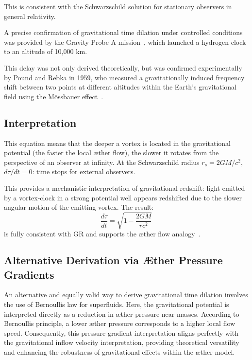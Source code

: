 This is consistent with the Schwarzschild solution for stationary observers in general relativity.

A precise confirmation of gravitational time dilation under controlled conditions was provided by the Gravity Probe A mission~\cite{vessot_levine_1980}, which launched a hydrogen clock to an altitude of 10,000 km.

This delay was not only derived theoretically, but was confirmed experimentally by Pound and Rebka in 1959, who measured a gravitationally induced frequency shift between two points at different altitudes within the Earth's gravitational field using the Mössbauer effect~\cite{pound_rebka_1959}.

\subsection*{Interpretation}

This equation means that the deeper a vortex is located in the gravitational potential (the faster the local æther flow), the slower it rotates from the perspective of an observer at infinity. At the Schwarzschild radius $r_s = 2GM/c^2$, $d\tau/dt = 0$: time stops for external observers.

This provides a mechanistic interpretation of gravitational redshift: light emitted by a vortex-clock in a strong potential well appears redshifted due to the slower angular motion of the emitting vortex. The result:
\[
\boxed{\frac{d\tau}{dt} = \sqrt{1 - \frac{2GM}{rc^2}}}
\]
is fully consistent with GR and supports the æther flow analogy~\cite{Schiller2022-maxforce}.

\subsection*{Alternative Derivation via Æther Pressure Gradients}

An alternative and equally valid way to derive gravitational time dilation involves the use of Bernoulli\rqs s law for superfluids. Here, the gravitational potential is interpreted directly as a reduction in æther pressure near masses. According to Bernoulli\rqs s principle, a lower æther pressure corresponds to a higher local flow speed. Consequently, this pressure gradient interpretation aligns perfectly with the gravitational inflow velocity interpretation, providing theoretical versatility and enhancing the robustness of gravitational effects within the æther model.